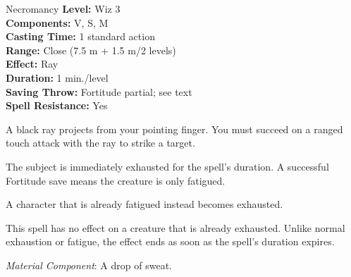 {Necromancy}
{
	\textbf{Level:}
	Wiz 3\\
	\textbf{Components:}
	V, S, M\\
	\textbf{Casting Time:}
	1 standard action\\
	\textbf{Range:}
	Close (7.5 m + 1.5 m/2 levels)\\
	\textbf{Effect:}
	Ray\\
	\textbf{Duration:}
	1 min./level\\
	\textbf{Saving Throw:}
	Fortitude partial; see text\\
	\textbf{Spell Resistance:}
	Yes\\
}
{
	A black ray projects from your pointing finger. You must succeed on a ranged touch attack with the ray to strike a target.

	The subject is immediately exhausted for the spell's duration. A successful Fortitude save means the creature is only fatigued.

	A character that is already fatigued instead becomes exhausted.

	This spell has no effect on a creature that is already exhausted. Unlike normal exhaustion or fatigue, the effect ends as soon as the spell's duration expires.

	\textit{Material Component}:
	A drop of sweat.

}
